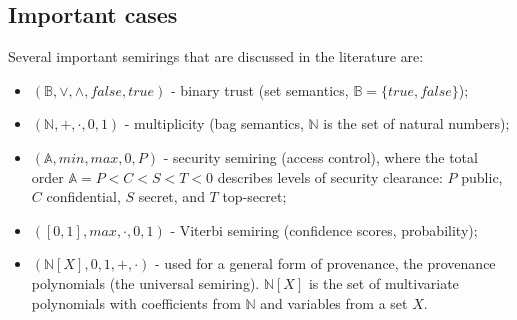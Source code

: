 \subsection{Important cases} Several important semirings that are discussed in the literature \cite{green2007provenance, Karvounarakis:2012:SDQ:2380776.2380778, Senellart2017} are:
\begin{itemize}
    \item $(\mathbb{B}, \vee, \wedge, false, true)$ - binary trust (set semantics, $\mathbb{B} = \{true, false\}$);
    \item $(\mathbb{N}, +, \cdot, 0, 1)$ - multiplicity (bag semantics, $\mathbb{N}$ is the set of natural numbers);
    \item $(\mathbb{A}, min, max, 0, P)$ - security semiring (access control), where the total order $\mathbb{A}=P<C<S<T<0$ describes levels of security clearance: $P$ public, $C$ confidential, $S$ secret, and $T$ top-secret;
    \item $([0,1], max, \cdot, 0, 1)$ - Viterbi semiring (confidence scores, probability);
    \item $(\mathbb{N}[X], 0, 1, +, \cdot)$ - used for a general form of provenance, the provenance polynomials (the universal semiring). $\mathbb{N}[X]$ is the set of multivariate polynomials with coefficients from $\mathbb{N}$ and variables from a set $X$.
\end{itemize}


